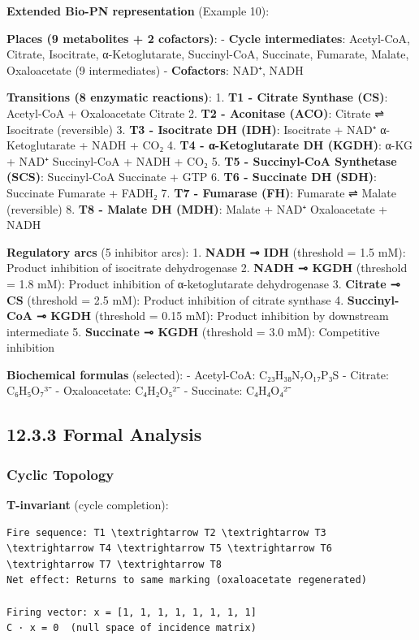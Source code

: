 \textbf{Extended Bio-PN representation} (Example 10):

\textbf{Places (9 metabolites + 2 cofactors)}: - \textbf{Cycle
intermediates}: Acetyl-CoA, Citrate, Isocitrate, α-Ketoglutarate,
Succinyl-CoA, Succinate, Fumarate, Malate, Oxaloacetate (9
intermediates) - \textbf{Cofactors}: NAD⁺, NADH

\textbf{Transitions (8 enzymatic reactions)}: 1. \textbf{T1 - Citrate
Synthase (CS)}: Acetyl-CoA + Oxaloacetate \textrightarrow Citrate 2. \textbf{T2 -
Aconitase (ACO)}: Citrate ⇌ Isocitrate (reversible) 3. \textbf{T3 -
Isocitrate DH (IDH)}: Isocitrate + NAD⁺ \textrightarrow α-Ketoglutarate + NADH + CO₂
4. \textbf{T4 - α-Ketoglutarate DH (KGDH)}: α-KG + NAD⁺ \textrightarrow Succinyl-CoA +
NADH + CO₂ 5. \textbf{T5 - Succinyl-CoA Synthetase (SCS)}: Succinyl-CoA
\textrightarrow Succinate + GTP 6. \textbf{T6 - Succinate DH (SDH)}: Succinate \textrightarrow
Fumarate + FADH₂ 7. \textbf{T7 - Fumarase (FH)}: Fumarate ⇌ Malate
(reversible) 8. \textbf{T8 - Malate DH (MDH)}: Malate + NAD⁺ \textrightarrow
Oxaloacetate + NADH

\textbf{Regulatory arcs} (5 inhibitor arcs): 1. \textbf{NADH ⊸ IDH}
(threshold = 1.5 mM): Product inhibition of isocitrate dehydrogenase 2.
\textbf{NADH ⊸ KGDH} (threshold = 1.8 mM): Product inhibition of
α-ketoglutarate dehydrogenase 3. \textbf{Citrate ⊸ CS} (threshold = 2.5
mM): Product inhibition of citrate synthase 4. \textbf{Succinyl-CoA ⊸
KGDH} (threshold = 0.15 mM): Product inhibition by downstream
intermediate 5. \textbf{Succinate ⊸ KGDH} (threshold = 3.0 mM):
Competitive inhibition

\textbf{Biochemical formulas} (selected): - Acetyl-CoA: C₂₃H₃₈N₇O₁₇P₃S -
Citrate: C₆H₅O₇³⁻ - Oxaloacetate: C₄H₂O₅²⁻ - Succinate: C₄H₄O₄²⁻

\hypertarget{formal-analysis-1}{%
\subsection{12.3.3 Formal Analysis}\label{formal-analysis-1}}

\hypertarget{cyclic-topology}{%
\subsubsection{Cyclic Topology}\label{cyclic-topology}}

\textbf{T-invariant} (cycle completion):

\begin{lstlisting}
Fire sequence: T1 \textrightarrow T2 \textrightarrow T3 \textrightarrow T4 \textrightarrow T5 \textrightarrow T6 \textrightarrow T7 \textrightarrow T8
Net effect: Returns to same marking (oxaloacetate regenerated)

Firing vector: x = [1, 1, 1, 1, 1, 1, 1, 1]
C · x = 0  (null space of incidence matrix)
\end{lstlisting}

